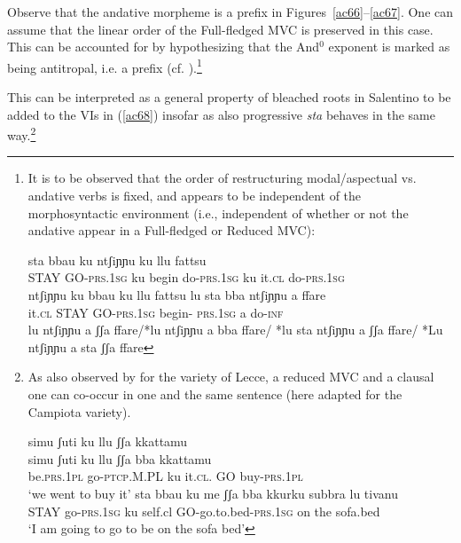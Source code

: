 \documentclass[output=paper]{langscibook}
\begin{document}
Observe that the andative morpheme is a prefix in Figures~\ref{ac66}--\ref{ac67}.  One can assume that the linear order of the Full-fledged MVC is preserved in this case.  This can be accounted for by hypothesizing that the And$^0$ exponent is marked as being antitropal, i.e. a prefix (cf. \citealt{bye2012a}).\footnote{It is to be observed that the order of restructuring modal/aspectual vs. andative verbs is fixed, and appears to be independent of the morphosyntactic environment (i.e., independent of whether or not the andative appear in a Full-fledged or Reduced MVC):

\ea \label{fn32ex}
    \ea \label{fn32exa}\gll sta bbau   ku ntʃiɲɲu   ku llu  fattsu\\
STAY GO-\textsc{prs}.\textsc{1sg} ku  begin do-\textsc{prs}.\textsc{1sg}  ku it.\textsc{cl} do-\textsc{prs}.\textsc{1sg}\\
\glt *ntʃiɲɲu ku bbau ku llu fattsu
    \ex \label{fn32exb}\gll lu  sta  bba   ntʃiɲɲu      a   ffare\\
it.\textsc{cl}  STAY GO-\textsc{prs}.\textsc{1sg} begin- \textsc{prs}.\textsc{1sg}  a   do-\textsc{inf}\\
\glt *lu ntʃiɲɲu a ʃʃa ffare/*lu ntʃiɲɲu a bba ffare/ *lu sta ntʃiɲɲu a ʃʃa ffare/ *Lu  ntʃiɲɲu a sta ʃʃa ffare
    \z
\z

}

This can be interpreted as a general property of bleached roots in Salentino to be added to the VIs in (\ref{ac68}) insofar as also progressive \textit{sta} behaves in the same way.\footnote{As also observed by \citealt{ledgeway2016a} for the variety of Lecce, a reduced MVC and a clausal one can co-occur in one and the same sentence (here adapted for the Campiota variety).

\ea \label{fn33ex}
    \ea \label{fn33exa}\glll simu      ʃuti        ku   llu     ʃʃa {} kkattamu\\
  simu      ʃuti       ku   llu    ʃʃa  bba kkattamu\\
  be.\textsc{prs}.\textsc{1pl} go-\textsc{ptcp}.M.PL  ku   it.\textsc{cl}.    GO  buy-\textsc{prs}.\textsc{1pl}\\
\glt  ‘we went to buy it’
    \ex \label{fn33exb}
    \gll sta   bbau                         ku  me       {ʃʃa bba           kkurku}      subbra lu tivanu\\
         STAY  go-\textsc{prs}.\textsc{1sg} ku  self.cl  GO-go.to.bed-\textsc{prs}.\textsc{1sg} on  the sofa.bed\\
    \glt ‘I am going to go to be on the sofa bed’
    \z
\z}
\end{document}
